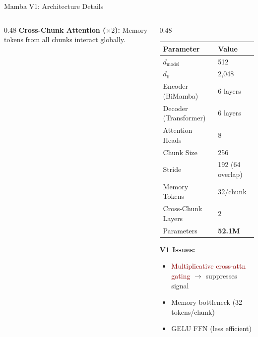 \documentclass[10pt, aspectratio=169]{beamer}
\begin{document}
\begin{frame}{Mamba V1: Architecture Details}
\begin{columns}[T]
\begin{column}{0.48\textwidth}
      \textbf{Cross-Chunk Attention ($\times 2$):}
      {\scriptsize Memory tokens from all chunks interact globally.}
    \end{column}
    \begin{column}{0.48\textwidth}
      \begin{table}
        \centering
        \scriptsize
        \begin{tabular}{ll}
          \toprule
          \textbf{Parameter} & \textbf{Value} \\
          \midrule
          $d_{\text{model}}$ & 512 \\
          $d_{\text{ff}}$ & 2,048 \\
          Encoder (BiMamba) & 6 layers \\
          Decoder (Transformer) & 6 layers \\
          Attention Heads & 8 \\
          Chunk Size & 256 \\
          Stride & 192 (64 overlap) \\
          Memory Tokens & 32/chunk \\
          Cross-Chunk Layers & 2 \\
          Parameters & \textbf{52.1M} \\
          \bottomrule
        \end{tabular}
      \end{table}

      \vspace{0.1cm}
      \textbf{V1 Issues:}
      \begin{itemize}\setlength{\itemsep}{0pt}
        \item \textcolor{darkred}{Multiplicative cross-attn gating} $\rightarrow$ suppresses signal
        \item Memory bottleneck (32 tokens/chunk)
        \item GELU FFN (less efficient)
      \end{itemize}
    \end{column}
  \end{columns}
\end{frame}
\end{document}
